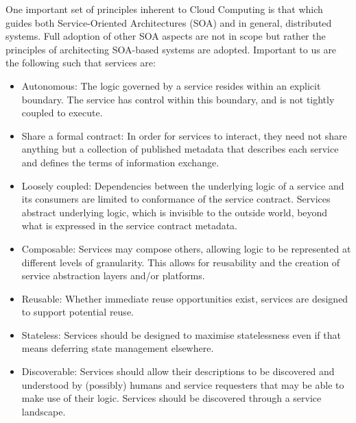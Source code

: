         One important set of principles inherent to Cloud Computing is that which guides both Service-Oriented Architectures (SOA) and in general, distributed systems. Full adoption of other SOA aspects are not in scope but rather the principles of architecting SOA-based systems are adopted. Important to us are the following such that services are:
        \begin{itemize}
            \item Autonomous: The logic governed by a service resides within an explicit boundary. The service has control within this boundary, and is not tightly coupled to execute.
            \item Share a formal contract: In order for services to interact, they need not share anything but a collection of published metadata that describes each service and defines the terms of information exchange.
            \item Loosely coupled: Dependencies between the underlying logic of a service and its consumers are limited to conformance of the service contract. Services abstract underlying logic, which is invisible to the outside world, beyond what is expressed in the service contract metadata.
            \item Composable: Services may compose others, allowing logic to be represented at different levels of granularity. This allows for reusability and the creation of service abstraction layers and/or platforms.
            \item Reusable: Whether immediate reuse opportunities exist, services are designed to support potential reuse.
            \item Stateless: Services should be designed to maximise statelessness even if that means deferring state management elsewhere.
            \item Discoverable: Services should allow their descriptions to be discovered and understood by (possibly) humans and service requesters that may be able to make use of their logic. Services should be discovered through a service landscape.
        \end{itemize}
        

